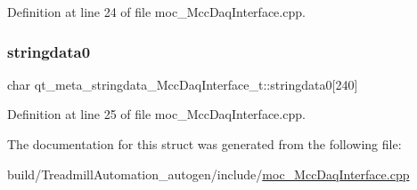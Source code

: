 Definition at line 24 of file moc\+\_\+\+Mcc\+Daq\+Interface.\+cpp.

\mbox{\label{structqt__meta__stringdata___mcc_daq_interface__t_a43702ce5256ac3912ebfe978a62ff642}} 
\subsubsection{\texorpdfstring{stringdata0}{stringdata0}}
{\footnotesize\ttfamily char qt\+\_\+meta\+\_\+stringdata\+\_\+\+Mcc\+Daq\+Interface\+\_\+t\+::stringdata0\mbox{[}240\mbox{]}}



Definition at line 25 of file moc\+\_\+\+Mcc\+Daq\+Interface.\+cpp.



The documentation for this struct was generated from the following file\+:\begin{DoxyCompactItemize}
\item 
build/\+Treadmill\+Automation\+\_\+autogen/include/\hyperlink{moc___mcc_daq_interface_8cpp}{moc\+\_\+\+Mcc\+Daq\+Interface.\+cpp}\end{DoxyCompactItemize}
